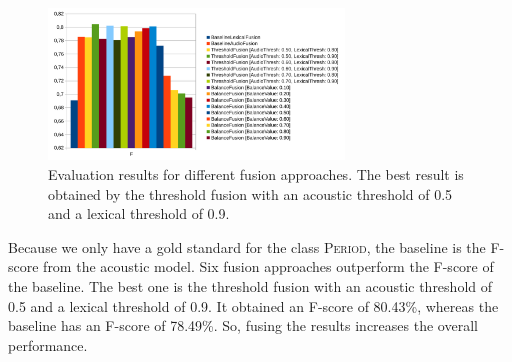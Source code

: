 \begin{figure}[ht]
    \centering
    \includegraphics[width=0.7\textwidth]{img/fusion_eval.pdf}
    \caption{Evaluation results for different fusion approaches. The best result is obtained by the threshold fusion with an acoustic threshold of 0.5 and a lexical threshold of 0.9.}
    \label{fig:eval_fusion}
\end{figure}

Because we only have a gold standard for the class \textsc{Period}, the baseline is the F-score from the acoustic model.
Six fusion approaches outperform the F-score of the baseline.
The best one is the threshold fusion with an acoustic threshold of 0.5 and a lexical threshold of 0.9.
It obtained an F-score of 80.43\%, whereas the baseline has an F-score of 78.49\%.
So, fusing the results increases the overall performance.